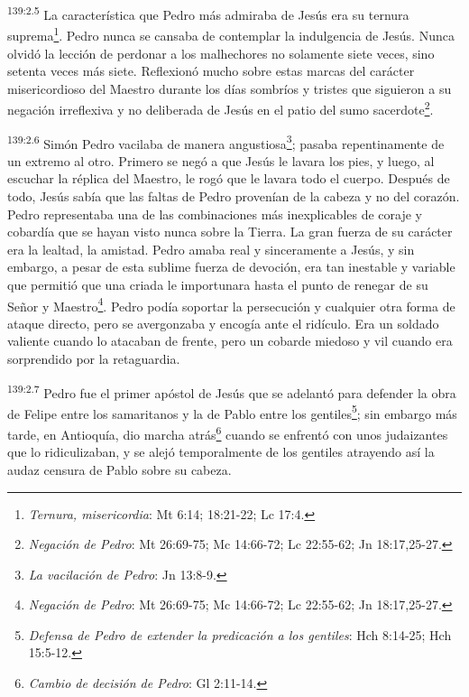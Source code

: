 \par
\textsuperscript{139:2.5} La característica que Pedro más admiraba de Jesús era su ternura suprema\footnote{\textit{Ternura, misericordia}: Mt 6:14; 18:21-22; Lc 17:4.}. Pedro nunca se cansaba de contemplar la indulgencia de Jesús. Nunca olvidó la lección de perdonar a los malhechores no solamente siete veces, sino setenta veces más siete. Reflexionó mucho sobre estas marcas del carácter misericordioso del Maestro durante los días sombríos y tristes que siguieron a su negación irreflexiva y no deliberada de Jesús en el patio del sumo sacerdote\footnote{\textit{Negación de Pedro}: Mt 26:69-75; Mc 14:66-72; Lc 22:55-62; Jn 18:17,25-27.}.

\par
\textsuperscript{139:2.6} Simón Pedro vacilaba de manera angustiosa\footnote{\textit{La vacilación de Pedro}: Jn 13:8-9.}; pasaba repentinamente de un extremo al otro. Primero se negó a que Jesús le lavara los pies, y luego, al escuchar la réplica del Maestro, le rogó que le lavara todo el cuerpo. Después de todo, Jesús sabía que las faltas de Pedro provenían de la cabeza y no del corazón. Pedro representaba una de las combinaciones más inexplicables de coraje y cobardía que se hayan visto nunca sobre la Tierra. La gran fuerza de su carácter era la lealtad, la amistad. Pedro amaba real y sinceramente a Jesús, y sin embargo, a pesar de esta sublime fuerza de devoción, era tan inestable y variable que permitió que una criada le importunara hasta el punto de renegar de su Señor y Maestro\footnote{\textit{Negación de Pedro}: Mt 26:69-75; Mc 14:66-72; Lc 22:55-62; Jn 18:17,25-27.}. Pedro podía soportar la persecución y cualquier otra forma de ataque directo, pero se avergonzaba y encogía ante el ridículo. Era un soldado valiente cuando lo atacaban de frente, pero un cobarde miedoso y vil cuando era sorprendido por la retaguardia.

\par
\textsuperscript{139:2.7} Pedro fue el primer apóstol de Jesús que se adelantó para defender la obra de Felipe entre los samaritanos y la de Pablo entre los gentiles\footnote{\textit{Defensa de Pedro de extender la predicación a los gentiles}: Hch 8:14-25; Hch 15:5-12.}; sin embargo más tarde, en Antioquía, dio marcha atrás\footnote{\textit{Cambio de decisión de Pedro}: Gl 2:11-14.} cuando se enfrentó con unos judaizantes que lo ridiculizaban, y se alejó temporalmente de los gentiles atrayendo así la audaz censura de Pablo sobre su cabeza.

